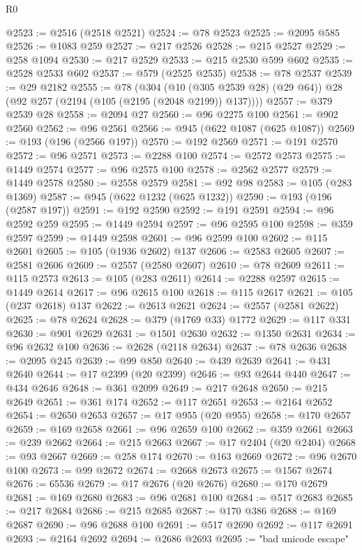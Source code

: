 \begin{lexlean}{R0}
\begin{coremodule}
@2523 := @2516 (@2518 @2521)
@2524 := @78 @2523
@2525 := @2095 @585
@2526 := @1083 @259
@2527 := @217 @2526
@2528 := @215 @2527
@2529 := @258 @1094
@2530 := @217 @2529
@2533 := @215 @2530 @599 @602
@2535 := @2528 @2533 @602
@2537 := @579 (@2525 @2535)
@2538 := @78 @2537
@2539 := @29 @2182
@2555 := @78
    (@304 (@10 (@305 @2539 @28) (@29 @64)) @28 (@92 @257 (@2194 (@105 (@2195 (@2048 @2199)) @137))))
@2557 := @379 @2539 @28
@2558 := @2094 @27
@2560 := @96 @2275 @100
@2561 := @902 @2560
@2562 := @96 @2561
@2566 := @945 (@622 @1087 (@625 @1087))
@2569 := @193 (@196 (@2566 @197))
@2570 := @192 @2569
@2571 := @191 @2570
@2572 := @96 @2571
@2573 := @2288 @100
@2574 := @2572 @2573
@2575 := @1449 @2574
@2577 := @96 @2575 @100
@2578 := @2562 @2577
@2579 := @1449 @2578
@2580 := @2558 @2579
@2581 := @92 @98
@2583 := @105 (@283 @1369)
@2587 := @945 (@622 @1232 (@625 @1232))
@2590 := @193 (@196 (@2587 @197))
@2591 := @192 @2590
@2592 := @191 @2591
@2594 := @96 @2592 @259
@2595 := @1449 @2594
@2597 := @96 @2595 @100
@2598 := @359 @2597
@2599 := @1449 @2598
@2601 := @96 @2599 @100
@2602 := @115 @2601
@2605 := @105 (@1936 @2602) @137
@2606 := @2583 @2605
@2607 := @2581 @2606
@2609 := @2557 (@2580 @2607)
@2610 := @78 @2609
@2611 := @115 @2573
@2613 := @105 (@283 @2611)
@2614 := @2288 @2597
@2615 := @1449 @2614
@2617 := @96 @2615 @100
@2618 := @115 @2617
@2621 := @105 (@237 @2618) @137
@2622 := @2613 @2621
@2624 := @2557 (@2581 @2622)
@2625 := @78 @2624
@2628 := @379 (@1769 @33) @1772
@2629 := @117 @331
@2630 := @901 @2629
@2631 := @1501 @2630
@2632 := @1350 @2631
@2634 := @96 @2632 @100
@2636 := @2628 (@2118 @2634)
@2637 := @78 @2636
@2638 := @2095 @245
@2639 := @99 @850
@2640 := @439 @2639
@2641 := @431 @2640
@2644 := @17 @2399 (@20 @2399)
@2646 := @93 @2644 @440
@2647 := @434 @2646
@2648 := @361 @2099
@2649 := @217 @2648
@2650 := @215 @2649
@2651 := @361 @174
@2652 := @117 @2651
@2653 := @2164 @2652
@2654 := @2650 @2653
@2657 := @17 @955 (@20 @955)
@2658 := @170 @2657
@2659 := @169 @2658
@2661 := @96 @2659 @100
@2662 := @359 @2661
@2663 := @239 @2662
@2664 := @215 @2663
@2667 := @17 @2404 (@20 @2404)
@2668 := @93 @2667
@2669 := @258 @174
@2670 := @163 @2669
@2672 := @96 @2670 @100
@2673 := @99 @2672
@2674 := @2668 @2673
@2675 := @1567 @2674
@2676 := 65536
@2679 := @17 @2676 (@20 @2676)
@2680 := @170 @2679
@2681 := @169 @2680
@2683 := @96 @2681 @100
@2684 := @517 @2683
@2685 := @217 @2684
@2686 := @215 @2685
@2687 := @170 @386
@2688 := @169 @2687
@2690 := @96 @2688 @100
@2691 := @517 @2690
@2692 := @117 @2691
@2693 := @2164 @2692
@2694 := @2686 @2693
@2695 := "bad unicode escape"

\end{coremodule}
\end{lexlean}
